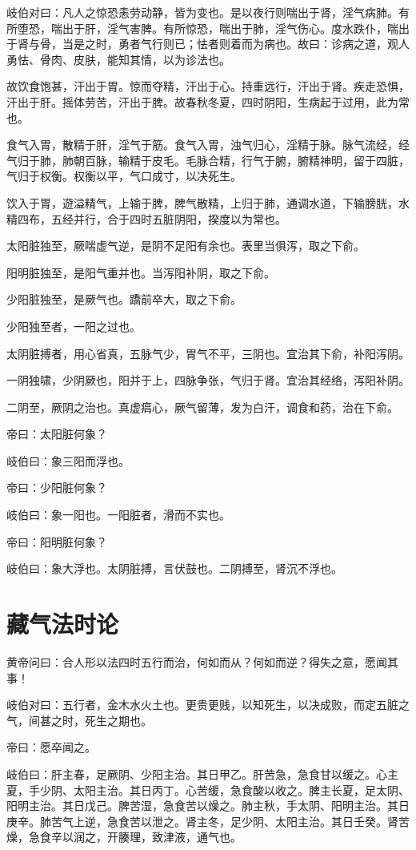 \documentclass{article}%
\begin{document}
岐伯对曰：凡人之惊恐恚劳动静，皆为变也。是以夜行则喘出于肾，淫气病肺。有所堕恐，喘出于肝，淫气害脾。有所惊恐，喘出于肺，淫气伤心。度水跌仆，喘出于肾与骨，当是之时，勇者气行则已；怯者则着而为病也。故曰：诊病之道，观人勇怯、骨肉、皮肤，能知其情，以为诊法也。

故饮食饱甚，汗出于胃。惊而夺精，汗出于心。持重远行，汗出于肾。疾走恐惧，汗出于肝。摇体劳苦，汗出于脾。故春秋冬夏，四时阴阳，生病起于过用，此为常也。

食气入胃，散精于肝，淫气于筋。食气入胃，浊气归心，淫精于脉。脉气流经，经气归于肺，肺朝百脉，输精于皮毛。毛脉合精，行气于腑，腑精神明，留于四脏，气归于权衡。权衡以平，气口成寸，以决死生。

饮入于胃，遊溢精气，上输于脾，脾气散精，上归于肺，通调水道，下输膀胱，水精四布，五经并行，合于四时五脏阴阳，揆度以为常也。

太阳脏独至，厥喘虚气逆，是阴不足阳有余也。表里当俱泻，取之下俞。

阳明脏独至，是阳气重并也。当泻阳补阴，取之下俞。

少阳脏独至，是厥气也。蹻前卒大，取之下俞。

少阳独至者，一阳之过也。

太阴脏搏者，用心省真，五脉气少，胃气不平，三阴也。宜治其下俞，补阳泻阴。

一阴独啸，少阴厥也，阳并于上，四脉争张，气归于肾。宜治其经络，泻阳补阴。

二阴至，厥阴之治也。真虚㾓心，厥气留薄，发为白汗，调食和药，治在下俞。

帝曰：太阳脏何象？

岐伯曰：象三阳而浮也。

帝曰：少阳脏何象？

岐伯曰：象一阳也。一阳脏者，滑而不实也。

帝曰：阳明脏何象？

岐伯曰：象大浮也。太阴脏搏，言伏鼓也。二阴搏至，肾沉不浮也。
\section{藏气法时论}
黄帝问曰：合人形以法四时五行而治，何如而从？何如而逆？得失之意，愿闻其事！

岐伯对曰：五行者，金木水火土也。更贵更贱，以知死生，以决成败，而定五脏之气，间甚之时，死生之期也。

帝曰：愿卒闻之。

岐伯曰：肝主春，足厥阴、少阳主治。其日甲乙。肝苦急，急食甘以缓之。心主夏，手少阴、太阳主治。其日丙丁。心苦缓，急食酸以收之。脾主长夏，足太阴、阳明主治。其日戊己。脾苦湿，急食苦以燥之。肺主秋，手太阴、阳明主治。其日庚辛。肺苦气上逆，急食苦以泄之。肾主冬，足少阴、太阳主治。其日壬癸。肾苦燥，急食辛以润之，开腠理，致津液，通气也。
\end{document}
